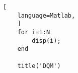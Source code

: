 \documentclass[14pt, a4paper]{extreport}
\begin{document}
\begin{center}
	\begin{lstlisting}[
	language=Matlab,
	]
	for i=1:N
		disp(i);
	end
	
	title('DQM')
\end{lstlisting}
\end{center}
	
\end{document}
